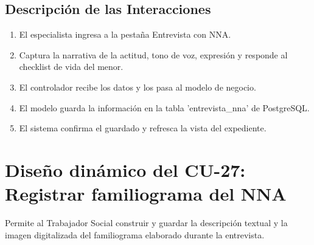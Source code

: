 \subsection{Descripción de las Interacciones}
\begin{enumerate}
    \item El especialista ingresa a la pestaña Entrevista con NNA.
    \item Captura la narrativa de la actitud, tono de voz, expresión y responde al checklist de vida del menor.
    \item El controlador recibe los datos y los pasa al modelo de negocio.
    \item El modelo guarda la información en la tabla 'entrevista\_nna' de PostgreSQL.
    \item El sistema confirma el guardado y refresca la vista del expediente.
\end{enumerate}

\cleardoublepage
\section{Diseño dinámico del CU-27: Registrar familiograma del NNA}
\label{sec:disenoDinamicoCU27}

Permite al Trabajador Social construir y guardar la descripción textual y la imagen digitalizada del familiograma elaborado durante la entrevista.

